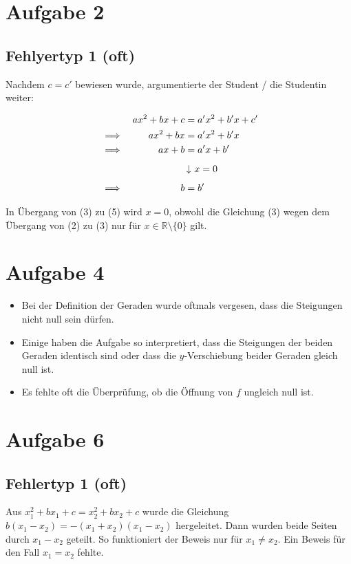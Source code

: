\documentclass[a4paper]{article}
\newcommand*{\R}{\mathbb R}
\begin{document}
\section{Aufgabe 2}

\subsection{Fehlyertyp 1 (oft)}

Nachdem $c=c'$ bewiesen wurde, argumentierte der Student / die Studentin weiter:

\begin{align}
  && ax^2+bx+c & = a'x^2+b'x+c' \\
  &\implies & ax^2+bx &= a'x^2 +b'x \\
  &\implies & ax+b & = a'x+b' \\[0.5em]
  &&& \left\downarrow\ x=0 \right. \\[0.5em]
  &\implies & b&=b'
\end{align}

In Übergang von (3) zu (5) wird $x=0$, obwohl die Gleichung (3) wegen dem Übergang von (2) zu (3) nur für $x\in\R\setminus\{0\}$ gilt.

\section{Aufgabe 4}

\begin{itemize}
  \item Bei der Definition der Geraden wurde oftmals vergesen, dass die Steigungen nicht null sein dürfen.
  \item Einige haben die Aufgabe so interpretiert, dass die Steigungen der beiden Geraden identisch sind oder dass die $y$-Verschiebung beider Geraden gleich null ist.
  \item Es fehlte oft die Überprüfung, ob die Öffnung von $f$ ungleich null ist.
\end{itemize}

\section{Aufgabe 6}

\subsection{Fehlertyp 1 (oft)}

Aus $x_1^2+bx_1+c=x_2^2+bx_2+c$ wurde die Gleichung $b(x_1-x_2)=-(x_1+x_2)(x_1-x_2)$ hergeleitet. Dann wurden beide Seiten durch $x_1-x_2$ geteilt. So funktioniert der Beweis nur für $x_1\neq x_2$. Ein Beweis für den Fall $x_1=x_2$ fehlte.
\end{document}
